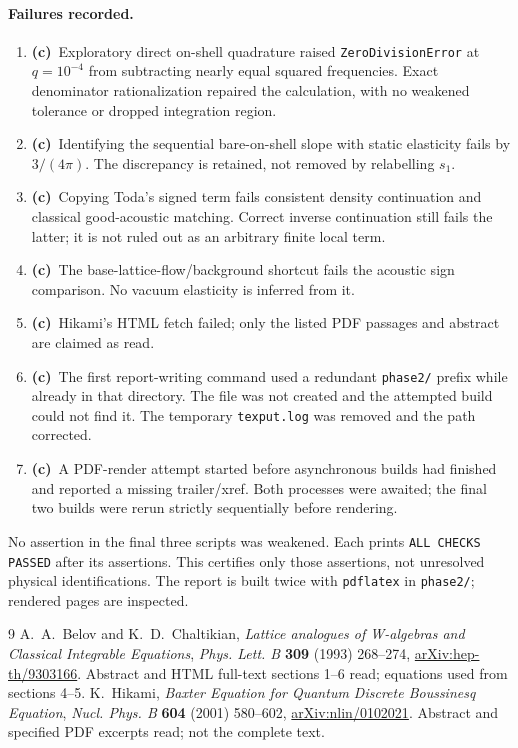 \documentclass[11pt,a4paper]{article}
\newcommand{\C}{\textbf{(c)}\ }
\newcommand{\file}[1]{\nolinkurl{#1}}
\begin{document}
\paragraph{Failures recorded.}
\begin{enumerate}
\item \C Exploratory direct on-shell quadrature raised
\file{ZeroDivisionError} at $q=10^{-4}$ from subtracting nearly equal
squared frequencies. Exact denominator rationalization repaired the
calculation, with no weakened tolerance or dropped integration region.
\item \C Identifying the sequential bare-on-shell slope with static
elasticity fails by $3/(4\pi)$. The discrepancy is retained, not removed
by relabelling $s_1$.
\item \C Copying Toda's signed term fails consistent density continuation
and classical good-acoustic matching. Correct inverse continuation still
fails the latter; it is not ruled out as an arbitrary finite local term.
\item \C The base-lattice-flow/background shortcut fails the acoustic
sign comparison. No vacuum elasticity is inferred from it.
\item \C Hikami's HTML fetch failed; only the listed PDF passages and
abstract are claimed as read.
\item \C The first report-writing command used a redundant
\file{phase2/} prefix while already in that directory. The file was not
created and the attempted build could not find it. The temporary
\file{texput.log} was removed and the path corrected.
\item \C A PDF-render attempt started before asynchronous builds had
finished and reported a missing trailer/xref. Both processes were awaited;
the final two builds were rerun strictly sequentially before rendering.
\end{enumerate}
No assertion in the final three scripts was weakened. Each prints
\texttt{ALL CHECKS PASSED} after its assertions. This certifies only those
assertions, not unresolved physical identifications. The report is built
twice with \file{pdflatex} in \file{phase2/}; rendered pages are inspected.

\begin{thebibliography}{9}
 A.~A.~Belov and K.~D.~Chaltikian,
\emph{Lattice analogues of W-algebras and Classical Integrable Equations},
\emph{Phys. Lett. B} \textbf{309} (1993) 268--274,
\href{https://arxiv.org/abs/hep-th/9303166}{arXiv:hep-th/9303166}.
Abstract and HTML full-text sections 1--6 read; equations used from
sections 4--5.
 K.~Hikami,
\emph{Baxter Equation for Quantum Discrete Boussinesq Equation},
\emph{Nucl. Phys. B} \textbf{604} (2001) 580--602,
\href{https://arxiv.org/abs/nlin/0102021}{arXiv:nlin/0102021}.
Abstract and specified PDF excerpts read; not the complete text.
\end{thebibliography}
\end{document}
